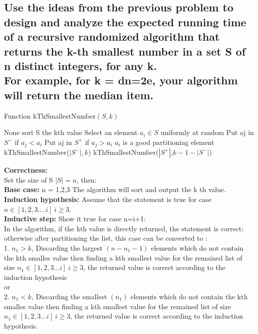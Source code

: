 \documentclass{article}
\begin{document}
\subsection{Use the ideas from the previous problem to design and analyze the expected
running time of a recursive randomized algorithm that returns the k-th smallest number in a
set S of n distinct integers, for any k.\\For example, for k = dn=2e, your algorithm will return the median item.}
\begin{algorithm}[H]
  \caption{Function kThSmallestNumber$(S,k)$}
  \label{alg1}
  \begin{algorithmic}
  \RETURN None
  \ENDIF
  \STATE sort S
  \RETURN the kth value
  \ENDIF
  \STATE Select an element $a_i\in S$ uniformly at random
  \STATE Put aj in $S^-$ if $a_j < a_i$
  \STATE Put aj in $S^+$ if $a_j > a_i$
  \ENDFOR
  \STATE $a_i$ is a good partitioning element
  \ENDIF
  \ENDFOR
  \RETURN kThSmallestNumber($|S^-|,k$)
  \ELSE
  \RETURN kThSmallestNumber($|S^+|$,$k-1-|S^-|$)
  \ENDIF
  \end{algorithmic}
\end{algorithm}
\noindent\textbf{\large Correctness:}\\
Set the size of S $|S|=n$, then:\\
\textbf{Base case:}  n = 1,2,3    The algorithm will sort and output the k th value.\\
\textbf{Induction hypothesis:} Assume that the statement is true for case $n \in [1,2,3....i]\ i\ge3$.\\
\textbf{Inductive step:} Show it true for case n=i+1:\\
In the algorithm, if the kth value is directly returned, the statement is correct; \\
otherwise after partitioning the list, this case can be converted to :\\
1. $n_1>k$, Discarding the largest $(n-n_1-1)$ elements which do not contain the kth smalles value then finding a kth smallest value for the remained list of size $n_1 \in [1,2,3...i]\ i\ge3$, the returned value is correct according to the induction hypothesis\\
or\\
2. $n_1<k$, Discarding the smallest $(n_1)$ elements which do not contain the kth smalles value then finding a kth smallest value for the remained list of size $n_1 \in [1,2,3...i]\ i\ge3$, the returned value is correct according to the induction hypothesis.\\
\end{document}
